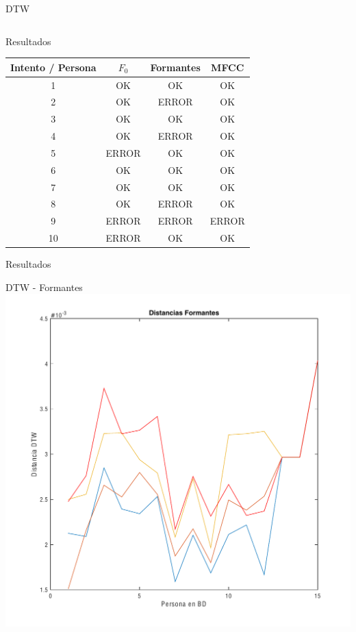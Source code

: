 \documentclass{beamer}
\begin{document}
\begin{frame}{DTW}
\begin{columns}
\end{columns}

\end{frame}

\begin{frame}{Resultados}

\begin{center}
\begin{tabular}{cccc} \toprule
Intento / Persona & $F_{0}$ & Formantes & MFCC \\ \midrule
1  & OK    & OK    & OK    \\
2  & OK    & ERROR & OK    \\
3  & OK    & OK    & OK    \\
4  & OK    & ERROR & OK    \\
5  & ERROR & OK    & OK    \\
6  & OK    & OK    & OK    \\
7  & OK    & OK    & OK    \\
8  & OK    & ERROR & OK    \\
9  & ERROR & ERROR & ERROR \\
10 & ERROR & OK    & OK    \\ \bottomrule
\end{tabular}
\end{center}

\end{frame}

\begin{frame}{Resultados}

\begin{center}
DTW - Formantes \\
\includegraphics[scale=0.35]{dFor}
\end{center}
\end{frame}
\end{document}
